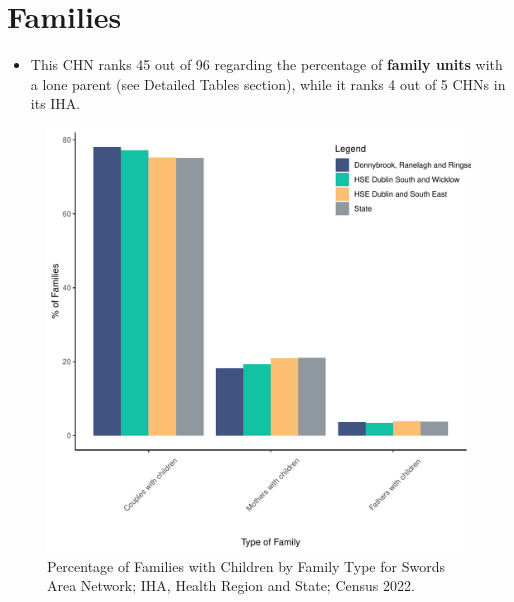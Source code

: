 \documentclass{article}
\begin{document}
\section{Families}\label{sect:Fam}
\begin{itemize}
\item This CHN ranks  45 out of 96 regarding the percentage of \textbf{family units} with a lone parent (see Detailed Tables section), while it ranks   4 out of 5 CHNs in its IHA.
\end{itemize}
\begin{figure}[H]
	\centering
	\includegraphics[width = 150mm]{../figures/FamED.pdf}
	\caption{Percentage of Families with Children by Family Type for Swords Area Network; IHA, Health Region and State; Census 2022.}
	\label{fig:vbnv}
	\end{figure}
	
\end{document}
